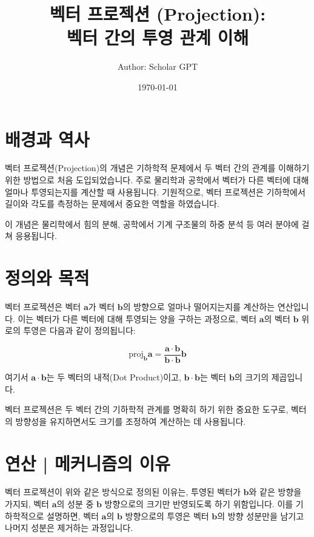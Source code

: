 \documentclass[12pt]{article}
\title{
    벡터 프로젝션 (Projection): \\
    벡터 간의 투영 관계 이해
}
\author{Author: Scholar GPT}
\date{\today}
\begin{document}
\maketitle
\tableofcontents

\section{배경과 역사}
\noindent 벡터 프로젝션(Projection)의 개념은 기하학적 문제에서 두 벡터 간의 관계를 이해하기 위한 방법으로 처음 도입되었습니다. 주로 물리학과 공학에서 벡터가 다른 벡터에 대해 얼마나 투영되는지를 계산할 때 사용됩니다. 기원적으로, 벡터 프로젝션은 기하학에서 길이와 각도를 측정하는 문제에서 중요한 역할을 하였습니다.

\vspace{1\baselineskip}
\noindent 이 개념은 물리학에서 힘의 분해, 공학에서 기계 구조물의 하중 분석 등 여러 분야에 걸쳐 응용됩니다.

\section{정의와 목적}
\noindent 벡터 프로젝션은 벡터 \( \mathbf{a} \)가 벡터 \( \mathbf{b} \)의 방향으로 얼마나 떨어지는지를 계산하는 연산입니다. 이는 벡터가 다른 벡터에 대해 투영되는 양을 구하는 과정으로, 벡터 \( \mathbf{a} \)의 벡터 \( \mathbf{b} \) 위로의 투영은 다음과 같이 정의됩니다:

\[
  \text{proj}_{\mathbf{b}} \mathbf{a} = \frac{\mathbf{a} \cdot \mathbf{b}}{\mathbf{b} \cdot \mathbf{b}} \mathbf{b}
\]

\noindent 여기서 \( \mathbf{a} \cdot \mathbf{b} \)는 두 벡터의 내적(Dot Product)이고, \( \mathbf{b} \cdot \mathbf{b} \)는 벡터 \( \mathbf{b} \)의 크기의 제곱입니다.

\noindent 벡터 프로젝션은 두 벡터 간의 기하학적 관계를 명확히 하기 위한 중요한 도구로, 벡터의 방향성을 유지하면서도 크기를 조정하여 계산하는 데 사용됩니다.

\section{연산 | 메커니즘의 이유}
\noindent 벡터 프로젝션이 위와 같은 방식으로 정의된 이유는, 투영된 벡터가 \( \mathbf{b} \)와 같은 방향을 가지되, 벡터 \( \mathbf{a} \)의 성분 중 \( \mathbf{b} \) 방향으로의 크기만 반영되도록 하기 위함입니다. 이를 기하학적으로 설명하면, 벡터 \( \mathbf{a} \)의 \( \mathbf{b} \) 방향으로의 투영은 벡터 \( \mathbf{b} \)의 방향 성분만을 남기고 나머지 성분은 제거하는 과정입니다.
\end{document}
